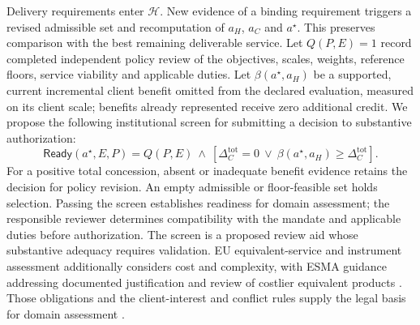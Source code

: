 \documentclass[oneside,10pt,english]{swissi}
\begin{document}
Delivery requirements enter $\mathcal H$. New evidence of a binding requirement triggers a revised admissible set and recomputation of $a_H$, $a_C$ and $a^\star$. This preserves comparison with the best remaining deliverable service. Let $Q(P,E)=1$ record completed independent policy review of the objectives, scales, weights, reference floors, service viability and applicable duties. Let $\beta(a^\star,a_H)$ be a supported, current incremental client benefit omitted from the declared evaluation, measured on its client scale; benefits already represented receive zero additional credit. We propose the following institutional screen for submitting a decision to substantive authorization:
\begin{equation}
 \mathsf{Ready}(a^\star,E,P)=
 Q(P,E)\ \land\
 \left[\Delta_C^{\mathrm{tot}}=0\ \lor\
 \beta(a^\star,a_H)\ge\Delta_C^{\mathrm{tot}}\right].
 \label{eq:authorization}
\end{equation}
For a positive total concession, absent or inadequate benefit evidence retains the decision for policy revision. An empty admissible or floor-feasible set holds selection. Passing the screen establishes readiness for domain assessment; the responsible reviewer determines compatibility with the mandate and applicable duties before authorization. The screen is a proposed review aid whose substantive adequacy requires validation. EU equivalent-service and instrument assessment additionally considers cost and complexity, with ESMA guidance addressing documented justification and review of costlier equivalent products \parencites[art.~54(9)]{europeancommission2017suitability}[paras.~91--95]{esma2022suitability}. Those obligations and the client-interest and conflict rules supply the legal basis for domain assessment \parencites[paras.~1 and 10]{esma2026mifid24}[arts.~25--26]{switzerland2018finsa}.
\end{document}
